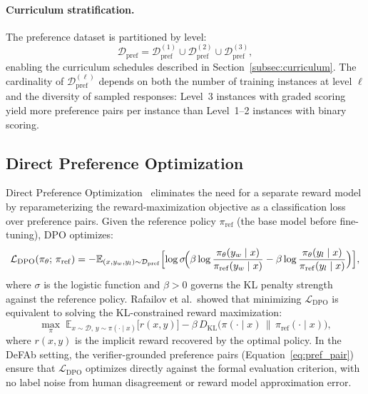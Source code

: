 \documentclass{article}
\theoremstyle{definition}
\begin{document}
\paragraph{Curriculum stratification.} The preference dataset is partitioned by level:
\begin{equation}\label{eq:strata}
    \mathcal{D}_{\mathrm{pref}} = \mathcal{D}_{\mathrm{pref}}^{(1)} \cup \mathcal{D}_{\mathrm{pref}}^{(2)} \cup \mathcal{D}_{\mathrm{pref}}^{(3)},
\end{equation}
enabling the curriculum schedules described in Section~\ref{subsec:curriculum}. The cardinality of $\mathcal{D}_{\mathrm{pref}}^{(\ell)}$ depends on both the number of training instances at level $\ell$ and the diversity of sampled responses: Level~3 instances with graded scoring yield more preference pairs per instance than Level~1--2 instances with binary scoring.


\subsection{Direct Preference Optimization}\label{subsec:dpo}

Direct Preference Optimization~\cite{rafailov2023direct} eliminates the need for a separate reward model by reparameterizing the reward-maximization objective as a classification loss over preference pairs. Given the reference policy $\pi_{\mathrm{ref}}$ (the base model before fine-tuning), DPO optimizes:
\begin{equation}\label{eq:dpo_loss}
    \mathcal{L}_{\mathrm{DPO}}(\pi_\theta;\, \pi_{\mathrm{ref}}) = -\mathbb{E}_{(x, y_w, y_l) \sim \mathcal{D}_{\mathrm{pref}}} \Bigl[ \log \sigma\!\Bigl(\beta \log \frac{\pi_\theta(y_w \mid x)}{\pi_{\mathrm{ref}}(y_w \mid x)} - \beta \log \frac{\pi_\theta(y_l \mid x)}{\pi_{\mathrm{ref}}(y_l \mid x)}\Bigr) \Bigr],
\end{equation}
where $\sigma$ is the logistic function and $\beta > 0$ governs the KL penalty strength against the reference policy. Rafailov et al.\ showed that minimizing $\mathcal{L}_{\mathrm{DPO}}$ is equivalent to solving the KL-constrained reward maximization:
\begin{equation}\label{eq:kl_obj}
    \max_{\pi} \; \mathbb{E}_{x \sim \mathcal{D},\, y \sim \pi(\cdot \mid x)} \bigl[ r(x, y) \bigr] - \beta \, D_{\mathrm{KL}}\!\bigl(\pi(\cdot \mid x) \,\big\|\, \pi_{\mathrm{ref}}(\cdot \mid x)\bigr),
\end{equation}
where $r(x,y)$ is the implicit reward recovered by the optimal policy. In the DeFAb setting, the verifier-grounded preference pairs (Equation~\ref{eq:pref_pair}) ensure that $\mathcal{L}_{\mathrm{DPO}}$ optimizes directly against the formal evaluation criterion, with no label noise from human disagreement or reward model approximation error.
\end{document}
